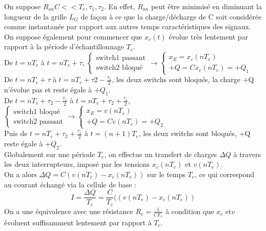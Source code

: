 \documentclass[main.tex]{subfiles}
\begin{document}
On suppose $R_{on}C << T_e,\tau_1,\tau_2$. En effet, $R_{on}$ peut être minimisé en diminuant la longueur de la grille $L_G$ de façon à ce que la charge/décharge de C soit considérée comme instantanée par rapport aux autres temps caractéristiques des signaux. On suppose également pour commencer que $x_c(t)$ évolue très lentement par rapport à la période d'échantillonnage $T_e$.\\

De $t=nT_e$ à $t=nT_e + \tau$, $\left\{ \begin{matrix}\text{switch1 passant}\\\text{switch2 bloqué}\end{matrix}\right.\rightarrow \left \{ \begin{matrix} x_E = x_c(nT_e)\\+Q = Cx_c(nT_e) = +Q_1\end{matrix} \right.$\\

De $t=nT_e + \tau$ à $t=nT_e + \tau2 - \frac{\tau_1}{2}$, les deux switchs sont bloqués, la charge +Q n'évolue pas et reste égale à $+Q_1$.\\

De $t=nT_e + \tau_2 - \frac{\tau_1}{2}$ à $t=nT_e + \tau_2 + \frac{\tau_1}{2}$, $\left\{ \begin{matrix}\text{switch1 bloqué}\\\text{switch2 passant}\end{matrix}\right.\rightarrow \left \{ \begin{matrix} x_E = v(nT_e)\\+Q = Cv(nT_e) = +Q_2\end{matrix} \right.$\\

Puis de $t=nT_e + \tau_2 + \frac{\tau_1}{2}$ à $t = (n+1)T_e$, les deux switchs sont bloqués, +Q reste égale à $+Q_2$.\\

Globalement sur une période $T_e$, on effectue un transfert de charges $\Delta Q$ à travers les deux interrupteurs, imposé par les tensions $x_c(nT_e)$ et $v(nT_e)$.\\

On a alors $\Delta Q = C(v(nT_e) - x_c(nT_e))$ sur le temps $T_e$, ce qui correspond au courant échangé via la cellule de base :
\[I = \frac{\Delta Q}{T_e} = \frac{C}{T_e}((v(nT_e) - x_c(nT_e))\]
On a une équivalence avec une résistance $R_e = \frac{1}{CF_e}$ à condition que $x_c$ et$v$ évoluent suffisamment lentement par rapport à $T_e$.\\
\end{document}
